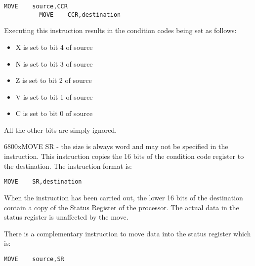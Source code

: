 \begin{lstlisting}[firstnumber=1,]
          MOVE    source,CCR
          MOVE    CCR,destination
\end{lstlisting}

Executing this instruction results in the condition codes being set
    as follows:
\begin{itemize}[itemsep=0pt]

\item{}X is set to bit 4 of source


\item{}N is set to bit 3 of source


\item{}Z is set to bit 2 of source


\item{}V is set to bit 1 of source


\item{}C is set to bit 0 of source

\end{itemize}

All the other bits are simply ignored.

\mc6800x{MOVE SR} -{} the size is always word and may not be specified in the
    instruction. This instruction copies the 16 bits of the condition code
    register to the destination. The instruction format is:

\begin{lstlisting}[firstnumber=1,]
          MOVE    SR,destination
\end{lstlisting}

When the instruction has been carried out, the lower 16 bits of the
    destination contain a copy of the Status Register of the processor. The
    actual data in the status register is unaffected by the move.

There is a complementary instruction to move data into the status
    register which is:

\begin{lstlisting}[firstnumber=1,]
          MOVE    source,SR
\end{lstlisting}

